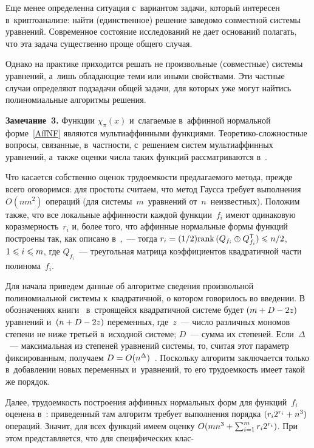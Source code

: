 \begin{multicols}{2}
Еще менее определенна ситуация с~вариантом задачи, который интересен 
в~криптоанализе: \mbox{найти} (единственное) решение заведомо совместной сис\-те\-мы 
уравнений. Современное состояние исследований не дает оснований полагать, что 
эта задача существенно проще общего случая.

Однако на практике приходится решать не произвольные (совместные) системы 
уравнений, а~лишь обладающие теми или иными свойствами. Эти частные случаи 
определяют подзадачи общей задачи, для которых уже могут найтись полиномиальные 
алгоритмы решения.

\medskip

\noindent
\textbf{Замечание~3.}
Функции $\chi_{\pi}(x)$ и~слагаемые в~аффинной нормальной форме~\eqref{AffNF} 
являются мультиаффинными функциями. Теоретико-сложностные вопросы, связанные, 
в~частности, с~решением сис\-тем мультиаффинных уравнений, а~также оценки чис\-ла 
таких функций рассматриваются в~\cite{Gor1995,GT2017}.


\medskip

Что касается собственно оценок трудоемкости предлагаемого метода, прежде всего 
оговоримся: для простоты считаем, что метод Гаусса требует выполнения~$O(nm^2)$ 
операций (для системы~$m$~уравнений от~$n$~неизвестных).
Положим также, что все локальные аффинности каждой функции~$f_i$ имеют 
одинаковую коразмерность~$r_i$ и, более того, что аффинные нормальные формы 
функций построены так, как описано в~\cite{LSF2019},~--- тогда
$r_i\hm=({1}/{2})\rank (Q_{f_i}\oplus Q_{f_i}\Tsf)\hm\leqslant 
{n}/{2}$, $1\hm\leqslant i\hm\leqslant  m$, 
где $Q_{f_i}$~--- треугольная матрица коэффициентов квад\-ра\-тич\-ной части   полинома~$f_i$.

Для начала приведем данные об алгоритме сведения произвольной полиномиальной 
системы к~квадратичной, о котором говорилось во введении.
В обозначениях книги~\cite{Bard2009} в~строящейся квад\-ра\-тичной системе будет 
$(m\hm+D\hm-2z)$ уравнений и~$(n\hm+D\hm-2z)$ переменных, где~$z$~--- 
число различных мономов 
степени не ниже третьей в~исходной системе; $D$~--- сумма их степеней. 
Если~$\Delta$~--- максимальная из степеней уравнений системы, то, считая этот 
параметр фиксированным, получаем $D\hm=O(n^{\Delta})$~\cite[\S{}.6]{Bard2009}. 
Поскольку алгоритм заключается только в~добавлении новых переменных и~уравнений, 
то его трудоемкость имеет такой же порядок.

Далее, трудоемкость
построения аффинных нормальных форм для функций~$f_i$ оценена в~\cite{LSF2019}: 
приведенный там алгоритм требует выполнения порядка $(r_i2^{r_i}\hm+ n^3)$ операций. 
Значит, для всех функций имеем оценку $O(mn^3\hm+\sum\nolimits_{i=1}^m r_i2^{r_i})$. 
При этом представляется, что для специфических клас-\linebreak\vspace*{-12pt}


\end{multicols}
